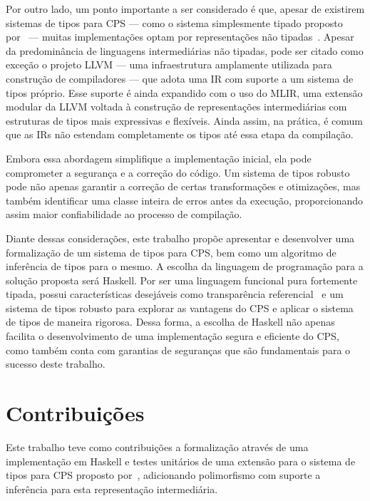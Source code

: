 Por outro lado, um ponto importante a ser considerado é que, apesar de existirem sistemas de tipos para CPS {---} como o sistema simplesmente tipado proposto por~ {---} muitas implementações optam por representações não tipadas~\cite{morrisett1999systemF,torrens2024operational}.
Apesar da predominância de linguagens intermediárias não tipadas, pode ser citado como exceção o projeto LLVM {---} uma infraestrutura amplamente utilizada para construção de compiladores {---} que adota uma IR com suporte a um sistema de tipos próprio.
Esse suporte é ainda expandido com o uso do MLIR, uma extensão modular da LLVM voltada à construção de representações intermediárias com estruturas de tipos mais expressivas e flexíveis.
Ainda assim, na prática, é comum que as IRs não estendam completamente os tipos até essa etapa da compilação.

Embora essa abordagem simplifique a implementação inicial, ela pode comprometer a segurança e a correção do código.
Um sistema de tipos robusto pode não apenas garantir a correção de certas transformações e otimizações, mas também identificar uma classe inteira de erros antes da execução, proporcionando assim maior confiabilidade ao processo de compilação.

Diante dessas considerações, este trabalho propõe apresentar e desenvolver uma formalização de um sistema de tipos para CPS, bem como um algoritmo de inferência de tipos para o mesmo.
A escolha da linguagem de programação para a solução proposta será Haskell.
Por ser uma linguagem funcional pura fortemente tipada, possui características desejáveis como transparência referencial~\cite{sondergaard1990transparency} e um sistema de tipos robusto para explorar as vantagens do CPS e aplicar o sistema de tipos de maneira rigorosa.
Dessa forma, a escolha de Haskell não apenas facilita o desenvolvimento de uma implementação segura e eficiente do CPS, como também conta com garantias de seguranças que são fundamentais para o sucesso deste trabalho.

\section{Contribuições}\label{sec:contribuicoes}

Este trabalho teve como contribuições a formalização através de uma implementação em Haskell e testes unitários de uma extensão para o sistema de tipos para CPS proposto por~, adicionando polimorfismo com suporte a inferência para esta representação intermediária.

